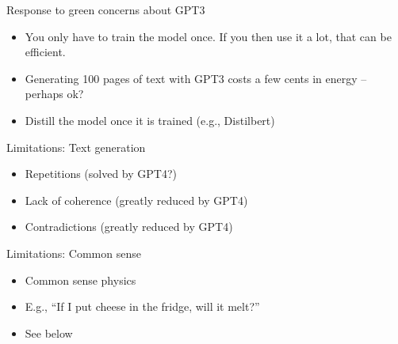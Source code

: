 \documentclass[11pt,compress,t,notes=noshow, xcolor=table]{beamer}
\begin{document}

\begin{frame}{Response to green concerns about GPT3}

\vfill

  \begin{itemize}
\item You only have to train the model once. If you
then use it a lot, that can be efficient.
\item Generating 100 pages of text with GPT3 costs a
few cents in energy -- perhaps ok?
\item Distill the model once it is trained (e.g., Distilbert)
    \end{itemize}
    
\vfill

\end{frame}


\begin{frame}{Limitations: Text generation}

\vfill

  \begin{itemize}
\item Repetitions (solved by GPT4?)
\item Lack of coherence (greatly reduced by GPT4)
\item Contradictions (greatly reduced by GPT4)
    \end{itemize}

\vfill

\end{frame}


\begin{frame}{Limitations: Common sense}

\vfill

  \begin{itemize}
\item Common sense physics
\item E.g., ``If I put cheese in the fridge, will it melt?''
\item See below
    \end{itemize}

\vfill

\end{frame}
\end{document}
